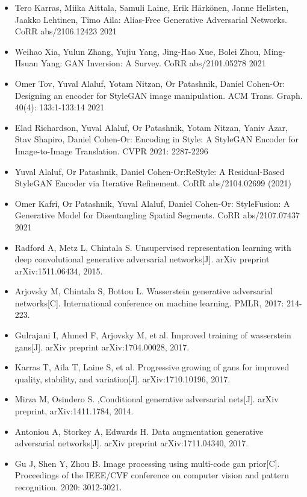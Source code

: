 \begin{itemize}
\item Tero Karras, Miika Aittala, Samuli Laine, Erik Härkönen, Janne Hellsten, Jaakko Lehtinen, Timo Aila: Alias-Free Generative Adversarial Networks. CoRR abs/2106.12423 2021
\item Weihao Xia, Yulun Zhang, Yujiu Yang, Jing-Hao Xue, Bolei Zhou, Ming-Hsuan Yang: GAN Inversion: A Survey. CoRR abs/2101.05278 2021
\item Omer Tov, Yuval Alaluf, Yotam Nitzan, Or Patashnik, Daniel Cohen-Or:
Designing an encoder for StyleGAN image manipulation. ACM Trans. Graph. 40(4): 133:1-133:14 2021
\item Elad Richardson, Yuval Alaluf, Or Patashnik, Yotam Nitzan, Yaniv Azar, Stav Shapiro, Daniel Cohen-Or: Encoding in Style: A StyleGAN Encoder for Image-to-Image Translation. CVPR 2021: 2287-2296
\item Yuval Alaluf, Or Patashnik, Daniel Cohen-Or:ReStyle: A Residual-Based StyleGAN Encoder via Iterative Refinement. CoRR abs/2104.02699 (2021)
\item Omer Kafri, Or Patashnik, Yuval Alaluf, Daniel Cohen-Or: StyleFusion: A Generative Model for Disentangling Spatial Segments. CoRR abs/2107.07437 2021
\item Radford A, Metz L, Chintala S. Unsupervised representation learning with deep convolutional generative adversarial networks[J]. arXiv preprint arXiv:1511.06434, 2015.
\item Arjovsky M, Chintala S, Bottou L. Wasserstein generative adversarial networks[C]. International conference on machine learning. PMLR, 2017: 214-223.
\item Gulrajani I, Ahmed F, Arjovsky M, et al. Improved training of wasserstein gans[J]. arXiv preprint arXiv:1704.00028, 2017.
\item Karras T, Aila T, Laine S, et al. Progressive growing of gans for improved quality, stability, and variation[J]. arXiv:1710.10196, 2017.
\item Mirza M, Osindero S. ,Conditional generative adversarial nets[J]. arXiv preprint, arXiv:1411.1784, 2014.
\item Antoniou A, Storkey A, Edwards H. Data augmentation generative adversarial networks[J]. arXiv preprint arXiv:1711.04340, 2017.
\item Gu J, Shen Y, Zhou B. Image processing using multi-code gan prior[C]. Proceedings of the IEEE/CVF conference on computer vision and pattern recognition. 2020: 3012-3021.
\end{itemize}

